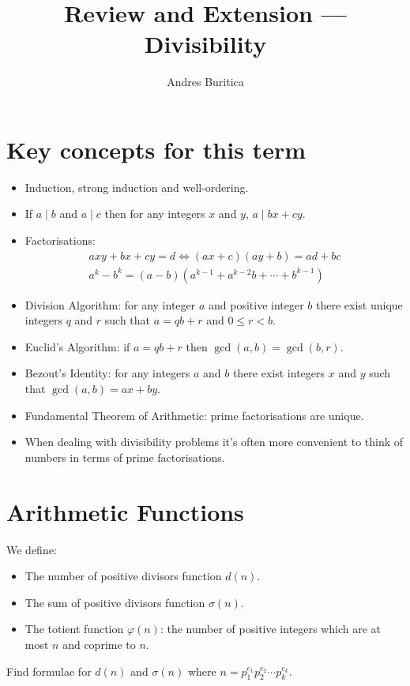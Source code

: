 \documentclass{article}
\title{Review and Extension --- Divisibility}
\author{Andres Buritica}
\date{}
\begin{document}
\maketitle
\section{Key concepts for this term}
  \begin{itemize}
    \item Induction, strong induction and well-ordering.
    \item If $a\mid b$ and $a\mid c$ then for any integers $x$ and $y$, $a\mid
      bx+cy$.
    \item Factorisations:
        \begin{align*}
          axy+bx+cy=d\iff (ax+c)(ay+b)=ad+bc \\
          a^k-b^k=(a-b)\left(a^{k-1}+a^{k-2}b+\cdots+b^{k-1}\right)
        \end{align*}
    \item Division Algorithm: for any integer $a$ and positive integer $b$ there
      exist unique integers $q$ and $r$ such that $a=qb+r$ and $0\le r<b$.
    \item Euclid's Algorithm: if $a=qb+r$ then $\gcd(a,b)=\gcd(b,r)$.
    \item Bezout's Identity: for any integers $a$ and $b$ there exist integers
      $x$ and $y$ such that $\gcd(a,b)=ax+by$.
    \item Fundamental Theorem of Arithmetic: prime factorisations are unique.
    \item When dealing with divisibility problems it's often more convenient to
      think of numbers in terms of prime factorisations.
  \end{itemize}
\section{Arithmetic Functions}
  We define:
  \begin{itemize}
    \item The number of positive divisors function $d(n)$.
    \item The sum of positive divisors function $\sigma(n)$.
    \item The totient function $\varphi(n)$: the number of positive integers
      which are at most $n$ and coprime to $n$.
  \end{itemize}
  Find formulae for $d(n)$ and $\sigma(n)$ where
    $n=p_1^{e_1}p_2^{e_2}\cdots p_k^{e_k}$.
\end{document}
